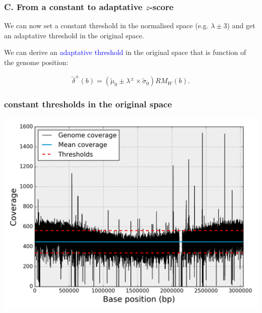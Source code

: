 \documentclass{beamer}
\begin{document}
\begin{frame}
\frametitle{C. From a constant to adaptative $z$-score}
\begin{block}{}
We can now set a constant threshold in the normalised space (e.g. $\lambda \pm 
3$) 
and get an adaptative threshold in the original space.
\end{block}

We can 
derive an \textcolor{blue}{adaptative threshold} in the 
original space that is function of the genome position: 

\begin{equation}
\tilde{\delta}^\pm(b) = \left( \widetilde{\mu}_0 \pm \lambda^\pm\times 
\widetilde{\sigma}_0    \right)RM_W(b).
\end{equation}

\end{frame}

\begin{frame}
 \frametitle{constant thresholds in the original space}
\includegraphics[height=0.9\textheight, 
    width=1\textwidth]{images/fig1.png}
 \end{frame}
\end{document}
